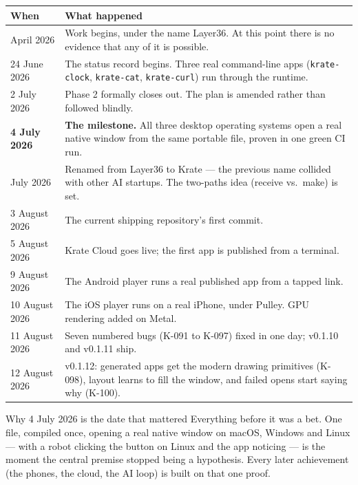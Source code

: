 \documentclass[11pt,a4paper]{report}
\begin{document}
\begin{center}
\begin{longtable}{lp{9.6cm}}
\toprule
\textbf{When} & \textbf{What happened} \\
\midrule
\endhead
April 2026 & Work begins, under the name Layer36. At this point there is no evidence that any of it is possible. \\
24 June 2026 & The status record begins. Three real command-line apps (\texttt{krate-clock}, \texttt{krate-cat}, \texttt{krate-curl}) run through the runtime. \\
2 July 2026 & Phase 2 formally closes out. The plan is amended rather than followed blindly. \\
\textbf{4 July 2026} & \textbf{The milestone.} All three desktop operating systems open a real native window from the same portable file, proven in one green CI run. \\
July 2026 & Renamed from Layer36 to Krate --- the previous name collided with other AI startups. The two-paths idea (receive vs.\ make) is set. \\
3 August 2026 & The current shipping repository's first commit. \\
5 August 2026 & Krate Cloud goes live; the first app is published from a terminal. \\
9 August 2026 & The Android player runs a real published app from a tapped link. \\
10 August 2026 & The iOS player runs on a real iPhone, under Pulley. GPU rendering added on Metal. \\
11 August 2026 & Seven numbered bugs (K-091 to K-097) fixed in one day; v0.1.10 and v0.1.11 ship. \\
12 August 2026 & v0.1.12: generated apps get the modern drawing primitives (K-098), layout learns to fill the window, and failed opens start saying why (K-100). \\
\bottomrule
\end{longtable}
\end{center}

\begin{plainbox}{Why 4 July 2026 is the date that mattered}
Everything before it was a bet. One file, compiled once, opening a real
native window on macOS, Windows and Linux --- with a robot clicking the
button on Linux and the app noticing --- is the moment the central premise
stopped being a hypothesis. Every later achievement (the phones, the cloud,
the AI loop) is built on that one proof.
\end{plainbox}
\end{document}
